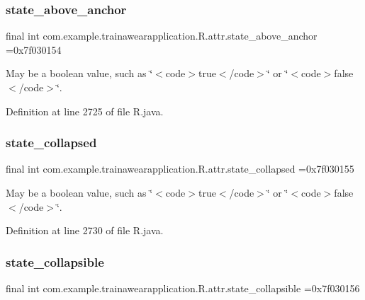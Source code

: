 \subsubsection{\texorpdfstring{state\_above\_anchor}{state\_above\_anchor}}
{\footnotesize\ttfamily final int com.\+example.\+trainawearapplication.\+R.\+attr.\+state\+\_\+above\+\_\+anchor =0x7f030154\hspace{0.3cm}{\ttfamily [static]}}

May be a boolean value, such as \char`\"{}$<$code$>$true$<$/code$>$\char`\"{} or \char`\"{}$<$code$>$false$<$/code$>$\char`\"{}. 

Definition at line 2725 of file R.\+java.

\mbox{\label{classcom_1_1example_1_1trainawearapplication_1_1_r_1_1attr_ad73414fe24d691a78d355552b068aefa}} 
\subsubsection{\texorpdfstring{state\_collapsed}{state\_collapsed}}
{\footnotesize\ttfamily final int com.\+example.\+trainawearapplication.\+R.\+attr.\+state\+\_\+collapsed =0x7f030155\hspace{0.3cm}{\ttfamily [static]}}

May be a boolean value, such as \char`\"{}$<$code$>$true$<$/code$>$\char`\"{} or \char`\"{}$<$code$>$false$<$/code$>$\char`\"{}. 

Definition at line 2730 of file R.\+java.

\mbox{\label{classcom_1_1example_1_1trainawearapplication_1_1_r_1_1attr_a3818c6d581680ca8f30348c0c7640da4}} 
\subsubsection{\texorpdfstring{state\_collapsible}{state\_collapsible}}
{\footnotesize\ttfamily final int com.\+example.\+trainawearapplication.\+R.\+attr.\+state\+\_\+collapsible =0x7f030156\hspace{0.3cm}{\ttfamily [static]}}

